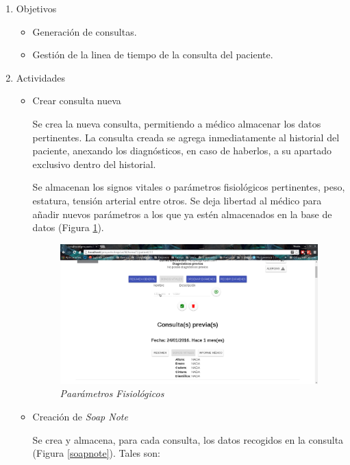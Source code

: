     \begin{enumerate}
        \item Objetivos
        \begin{itemize}
            \item Generación de consultas.
            \item Gestión de la linea de tiempo de la consulta del paciente.
        \end{itemize}
        \item Actividades
        \begin{itemize}
            \item Crear consulta nueva
            
            Se crea la nueva consulta, permitiendo a médico almacenar los datos pertinentes. La consulta creada se agrega inmediatamente al historial del paciente, anexando los diagnósticos, en caso de haberlos, a su apartado exclusivo dentro del historial.
            
            Se almacenan los signos vitales o parámetros fisiológicos pertinentes, peso, estatura, tensión arterial entre otros. Se deja libertad al médico para añadir nuevos parámetros a los que ya estén almacenados en la base de datos (Figura \ref{parametros}).
            
            \begin{figure}[htbp!]
                \begin{center}
                    \includegraphics[width=.8\textwidth]{figures/p13}
                \end{center}
                \caption{\textit{Paarámetros Fisiológicos}}
                \label{parametros}
            \end{figure}
            
            \item Creación de \textit{Soap Note}
            
            Se crea y almacena, para cada consulta, los datos recogidos en la consulta (Figura \ref{soapnote}). Tales son:
            

\end{itemize}
\end{enumerate}
